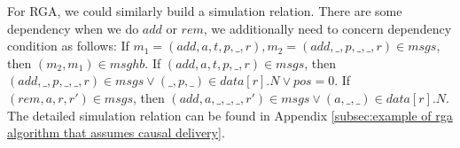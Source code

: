 







For RGA, we could similarly build a simulation relation. There are some dependency when we do $\mathit{add}$ or $\mathit{rem}$, we additionally need to concern dependency condition as follows: If $m_1 = (\mathit{add},a,t,p,\_,r), m_2 = (\mathit{add},\_,p,\_,\_,r) \in \mathit{msgs}$, then $(m_2,m_1) \in \mathit{msghb}$. If $(\mathit{add},a,t,p,\_,r) \in \mathit{msgs}$, then $(\mathit{add},\_,p,\_,\_,r) \in \mathit{msgs} \vee (\_,p,\_) \in \mathit{data}[r].N \vee \mathit{pos}=0$. If $(\mathit{rem},a,r,r') \in \mathit{msgs}$, then $(\mathit{add},a,\_,\_,\_,r') \in \mathit{msgs} \vee (a,\_,\_) \in \mathit{data}[r].N$. The detailed simulation relation can be found in Appendix \ref{subsec:example of rga algorithm that assumes causal delivery}. 

